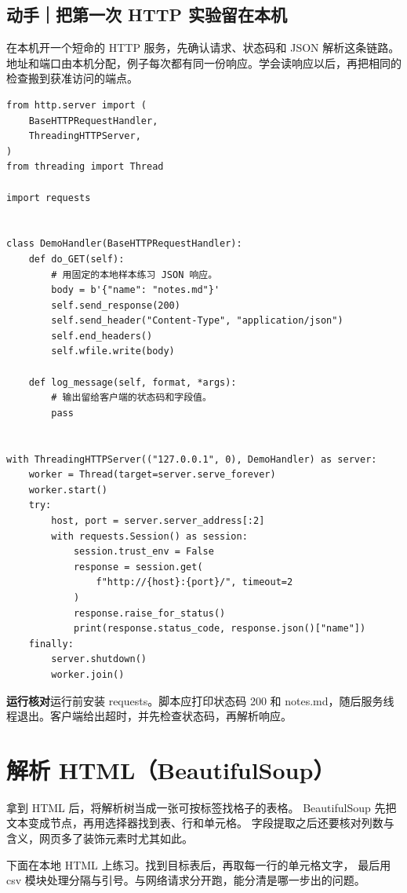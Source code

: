 \documentclass[UTF8,a4paper,oneside,openany,fontset=none,11pt]{ctexbook}
\newcommand{\code}[1]{\texttt{\detokenize{#1}}}
\begin{document}
\subsection*{动手｜把第一次 HTTP 实验留在本机}

在本机开一个短命的 HTTP 服务，先确认请求、状态码和 JSON 解析这条链路。地址和端口由本机分配，例子每次都有同一份响应。学会读响应以后，再把相同的检查搬到获准访问的端点。

\begin{lstlisting}[title={\code{local_http.py}}]
from http.server import (
    BaseHTTPRequestHandler,
    ThreadingHTTPServer,
)
from threading import Thread

import requests


class DemoHandler(BaseHTTPRequestHandler):
    def do_GET(self):
        # 用固定的本地样本练习 JSON 响应。
        body = b'{"name": "notes.md"}'
        self.send_response(200)
        self.send_header("Content-Type", "application/json")
        self.end_headers()
        self.wfile.write(body)

    def log_message(self, format, *args):
        # 输出留给客户端的状态码和字段值。
        pass


with ThreadingHTTPServer(("127.0.0.1", 0), DemoHandler) as server:
    worker = Thread(target=server.serve_forever)
    worker.start()
    try:
        host, port = server.server_address[:2]
        with requests.Session() as session:
            session.trust_env = False
            response = session.get(
                f"http://{host}:{port}/", timeout=2
            )
            response.raise_for_status()
            print(response.status_code, response.json()["name"])
    finally:
        server.shutdown()
        worker.join()
\end{lstlisting}

\textbf{运行核对}\enspace 运行前安装 requests。脚本应打印状态码 200 和 notes.md，随后服务线程退出。客户端给出超时，并先检查状态码，再解析响应。

\section[解析 HTML]{解析 HTML（BeautifulSoup）}

拿到 HTML 后，将解析树当成一张可按标签找格子的表格。
BeautifulSoup 先把文本变成节点，再用选择器找到表、行和单元格。
字段提取之后还要核对列数与含义，网页多了装饰元素时尤其如此。

下面在本地 HTML 上练习。找到目标表后，再取每一行的单元格文字，
最后用 csv 模块处理分隔与引号。与网络请求分开跑，能分清是哪一步出的问题。
\end{document}
